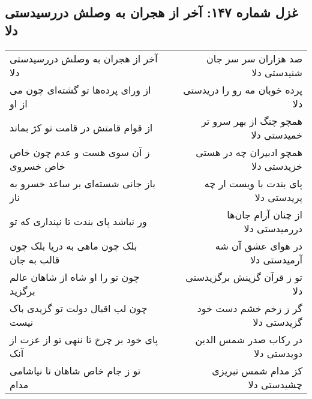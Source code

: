 \begin{center}
\section*{غزل شماره ۱۴۷: آخر از هجران به وصلش دررسیدستی دلا}
\label{sec:0147}
\begin{longtable}{l p{0.5cm} r}
آخر از هجران به وصلش دررسیدستی دلا
&&
صد هزاران سر سر جان شنیدستی دلا
\\
از ورای پرده‌ها تو گشته‌ای چون می از او
&&
پرده خوبان مه رو را دریدستی دلا
\\
از قوام قامتش در قامت تو کژ بماند
&&
همچو چنگ از بهر سرو تر خمیدستی دلا
\\
ز آن سوی هست و عدم چون خاص خاص خسروی
&&
همچو ادبیران چه در هستی خزیدستی دلا
\\
باز جانی شسته‌ای بر ساعد خسرو به ناز
&&
پای بندت با ویست ار چه پریدستی دلا
\\
ور نباشد پای بندت تا نپنداری که تو
&&
از چنان آرام جان‌ها دررمیدستی دلا
\\
بلک چون ماهی به دریا بلک چون قالب به جان
&&
در هوای عشق آن شه آرمیدستی دلا
\\
چون تو را او شاه از شاهان عالم برگزید
&&
تو ز قرآن گزینش برگزیدستی دلا
\\
چون لب اقبال دولت تو گزیدی باک نیست
&&
گر ز زخم خشم دست خود گزیدستی دلا
\\
پای خود بر چرخ تا ننهی تو از عزت از آنک
&&
در رکاب صدر شمس الدین دویدستی دلا
\\
تو ز جام خاص شاهان تا نیاشامی مدام
&&
کز مدام شمس تبریزی چشیدستی دلا
\\
\end{longtable}
\end{center}
